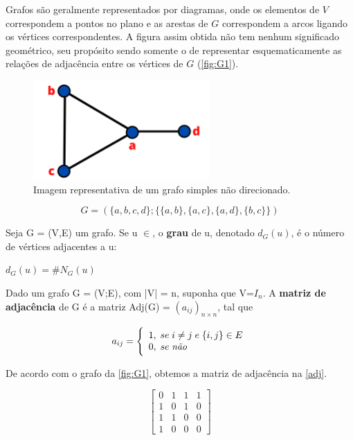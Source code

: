 Grafos são geralmente representados por diagramas, onde os elementos de $V$ correspondem a pontos no plano e as arestas de $G$ correspondem a arcos ligando os vértices correspondentes. A figura assim obtida não tem nenhum significado geométrico, seu propósito sendo somente o de representar esquematicamente as relações de adjacência entre os vértices de $G$ (\autoref{fig:G1}).

\begin{figure}[htb]
	\caption{\label{fig:G1} Imagem representativa de um grafo simples não direcionado.}
	\begin{center}
		\includegraphics[width=0.6\textwidth]{images/grafo.png}
	\end{center}
\end{figure}

\begin{equation}
    G = (\{a,b,c,d\}; \{\{a,b\},\{a,c\},\{a,d\}, \{b,c\}\})
\end{equation}

\begin{definition}
Seja G = (V,E) um grafo. Se u $\in$, o \textbf{grau} de u, denotado $d_G(u)$, é o número de vértices adjacentes a u: 
\begin{center}
$d_G(u) = \#N_G(u)$
\end{center}
\end{definition}

\begin{definition}
Dado um grafo G = (V;E), com |V| = n, suponha que V=$I_n$. A \textbf{matriz de adjacência} de G é a matriz Adj(G) = $(a_{ij})_{n\times n}$, tal que
\begin{center}
\begin{equation*}
a_{ij}= \Bigg{\{} \begin{array}{ll} 1, \; se \; i\neq j  \; e \; \{i,j\} \in E \\ 0, \; se \; \textrm{\textit{não}} \end{array}
\end{equation*}
\end{center}
\end{definition}

De acordo com o grafo da \autoref{fig:G1}, obtemos a matriz de adjacência na \autoref{adj}.

\begin{equation}
\label{adj}
    \begin{bmatrix}
       0 & 1 & 1 & 1 \\
       1 & 0 & 1 & 0 \\
       1 & 1 & 0 & 0 \\
       1 & 0 & 0 & 0 
    \end{bmatrix}
\end{equation}